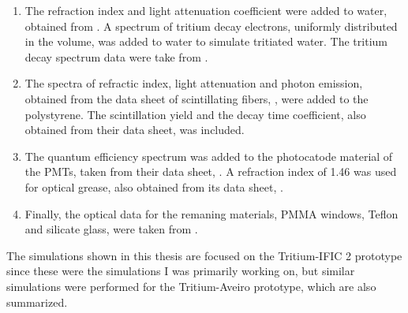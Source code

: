 \begin{enumerate}
%
\item{} The refraction index and light attenuation coefficient were added to water, obtained from \cite{WaterPropertiesSimulation}. A spectrum of tritium decay electrons, uniformly distributed in the volume, was added to water to simulate tritiated water. The tritium decay spectrum data were take from \cite{TritiumEmissionSpectrum}.

\item{} The spectra of refractic index, light attenuation and photon emission, obtained from the data sheet of scintillating fibers, \cite{DataSheetBCF12Fiber}, were added to the polystyrene. The scintillation yield and the decay time coefficient, also obtained from their data sheet, was included.

\item{} The quantum efficiency spectrum was added to the photocatode material of the PMTs, taken from their data sheet, \cite{DataSheetPMTs}. A refraction index of 1.46 was used for optical grease, also obtained from its data sheet, \cite{OpticalGrease}.

\item{} Finally, the optical data for the remaning materials, PMMA windows, Teflon and silicate glass, were taken from \cite{NEMODataSimulation}.

\end{enumerate} 

The simulations shown in this thesis are focused on the Tritium-IFIC 2 prototype since these were the simulations I was primarily working on, but similar simulations were performed for the Tritium-Aveiro prototype, which are also summarized.